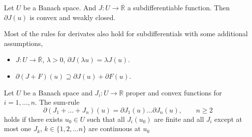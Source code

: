 \begin{theorem}
	Let $U$ be a Banach space. And $J: U\rightarrow \overline{\mathbb{R}}$ a subdifferentiable function. Then $\partial J(u)$ is convex and weakly closed.
\end{theorem}

\begin{remark}
	Most of the rules for derivates also hold for subdifferentials with some additional assumptions,
	\begin{itemize}
		\item $J:U\rightarrow \overline{\mathbb{R}}$, $\lambda > 0$, $\partial J(\lambda u)=\lambda J(u)$.
		\item $\partial(J+F)(u) \supseteq \partial J(u)+ \partial F(u)$.
	\end{itemize}
\end{remark}

\begin{theorem}
	\label{th5. Moreau-Rockafellar}
	Let $U$ be a Banach space and $J_i: U\rightarrow \mathbb{R}$ proper and convex functions for $i=1,\dots, n$.
	The sum-rule
	\[
		\partial(J_1+\dots+J_n)(u)=\partial J_1(u)\dots \partial J_n(u), \qquad n\geq 2
	\]
	holds if there exists $u_0 \in U$ such that all $J_i(u_0)$ are finite and all $J_i$ except at most one $J_k$, $k\in \lbrace 1,2,\dots n\rbrace$ are continuous at $u_0$
\end{theorem}